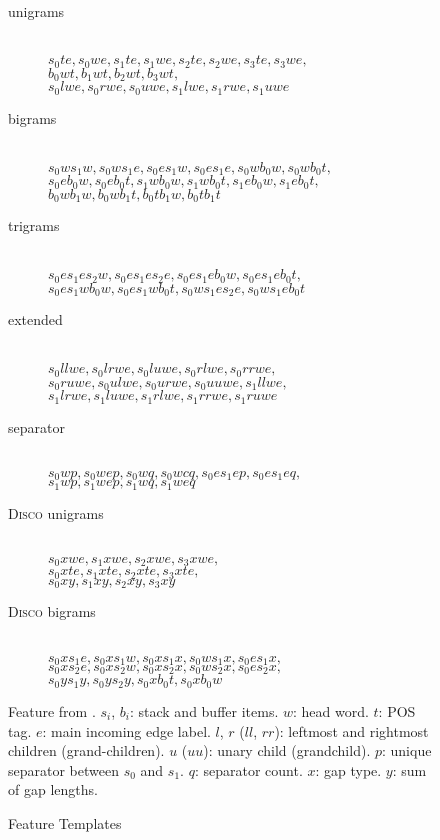 \documentclass[11pt]{article}
\begin{document}
\begin{figure}[t]
\begin{description}
	\item[unigrams] \hfill \\
	$s_0te, s_0we, s_1te, s_1we, s_2te, s_2we, s_3te, s_3we,$ \\
	$b_0wt, b_1wt, b_2wt, b_3wt,$ \\
	$s_0lwe, s_0rwe, s_0uwe, s_1lwe, s_1rwe, s_1uwe$
	\item[bigrams] \hfill \\
	$s_0ws_1w, s_0ws_1e, s_0es_1w, s_0es_1e, s_0wb_0w, s_0wb_0t,$ \\
	$s_0eb_0w, s_0eb_0t, s_1wb_0w, s_1wb_0t, s_1eb_0w, s_1eb_0t,$ \\
	$b_0wb_1w, b_0wb_1t, b_0tb_1w, b_0tb_1t$
	\item[trigrams] \hfill \\
	$s_0es_1es_2w, s_0es_1es_2e, s_0es_1eb_0w, s_0es_1eb_0t,$ \\
	$s_0es_1wb_0w, s_0es_1wb_0t, s_0ws_1es_2e, s_0ws_1eb_0t$
	\item[extended] \hfill \\
	$s_0llwe, s_0lrwe, s_0luwe, s_0rlwe, s_0rrwe,$ \\
	$s_0ruwe, s_0ulwe, s_0urwe, s_0uuwe, s_1llwe,$ \\
	$s_1lrwe, s_1luwe, s_1rlwe, s_1rrwe, s_1ruwe$
	\item[separator] \hfill \\
	$s_0wp, s_0wep, s_0wq, s_0wcq, s_0es_1ep, s_0es_1eq,$ \\
	$s_1wp, s_1wep, s_1wq, s_1weq$
	\item[\textsc{Disco} unigrams] \hfill \\
	$s_0xwe, s_1xwe, s_2xwe, s_3xwe,$ \\
	$s_0xte, s_1xte, s_2xte, s_3xte,$ \\
	$s_0xy, s_1xy, s_2xy, s_3xy$
	\item[\textsc{Disco} bigrams] \hfill \\
	$s_0xs_1e, s_0xs_1w, s_0xs_1x, s_0ws_1x, s_0es_1x,$ \\
	$s_0xs_2e, s_0xs_2w, s_0xs_2x, s_0ws_2x, s_0es_2x,$ \\
	$s_0ys_1y, s_0ys_2y, s_0xb_0t, s_0xb_0w$
\end{description}
\caption{Feature Templates}
\medskip
\small
Feature from \cite{maier2015discontinuous}.
$s_i$, $b_i$: stack and buffer items.
$w$: head word. $t$: POS tag.
$e$: main incoming edge label.
$l$, $r$ ($ll$, $rr$): leftmost and rightmost children (grand-children).
$u$ ($uu$): unary child (grandchild).
$p$: unique separator between $s_0$ and $s_1$.
$q$: separator count.
$x$: gap type.
$y$: sum of gap lengths.
\label{fig:features}
\end{figure}
\end{document}
